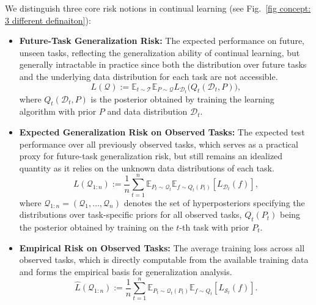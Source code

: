 \documentclass[letterpaper]{article} %
\begin{document}
We distinguish three core risk notions in continual learning (see Fig.~\ref{fig concept: 3 different definaiton}):
\begin{itemize}
    \item \textbf{Future-Task Generalization Risk:} The expected performance on future, unseen tasks, reflecting the generalization ability of continual learning, but generally intractable in practice since both the distribution over future tasks and the underlying data distribution for each task are not accessible.
    \begin{equation}
        L(\mathcal{Q}) := \mathbb{E}_{t \sim \mathcal{T}}\mathbb{E}_{P \sim \mathcal{Q}}L_{\mathcal{D}_t}\big(Q_t(\mathcal{D}_t, P)\big),
    \end{equation}
    where $Q_t(\mathcal{D}_t, P )$ is the posterior obtained by training the learning algorithm with prior $P$ and data distribution $\mathcal{D}_t$.
    \item \textbf{Expected Generalization Risk on Observed Tasks:}  The expected test performance over all previously observed tasks, which serves as a practical proxy for future-task generalization risk, but still remains an idealized quantity as it relies on the unknown data distributions of each task.
    \begin{equation}
        L(\mathcal{Q}_{1:n}) := \frac{1}{n} \sum_{t=1}^n \mathbb{E}_{P_{t} \sim \mathcal{Q}_{t}} \mathbb{E}_{f \sim Q_t(P_t)} [ L_{\mathcal{D}_t}(f) ],
    \end{equation}
    where  $\mathcal{Q}_{1:n} = (\mathcal{Q}_1, \ldots, \mathcal{Q}_n)$ denotes the set of hyperposteriors specifying the distributions over task-specific priors for all observed tasks, $Q_t(P_t)$ being the posterior obtained by training on the $t$-th task with prior $P_t$.
    \item \textbf{Empirical Risk on Observed Tasks:} The average training loss across all observed tasks, which is directly computable from the available training data and forms the empirical basis for generalization analysis.
    \begin{equation}
        \hat{L}(\mathcal{Q}_{1:n}) := \frac{1}{n} \sum_{t=1}^n \mathbb{E}_{P_t \sim \mathcal{Q}_t(P_t)} \mathbb{E}_{f \sim Q_t}  [ L_{\mathcal{S}_t}(f) ].
    \end{equation}
\end{itemize}

\end{document}
